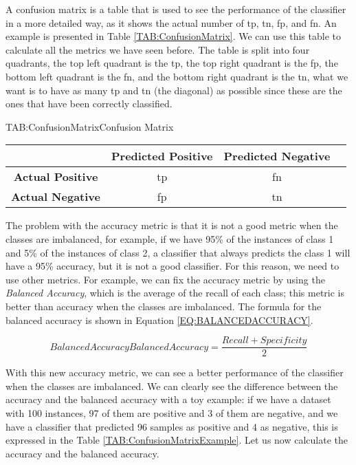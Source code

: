 A confusion matrix is a table that is used to see the performance of the classifier in a more detailed way, as it shows the actual number of \ac{tp}, \ac{tn}, \ac{fp}, and \ac{fn}. An example is presented in Table \ref{TAB:ConfusionMatrix}. We can use this table to calculate all the metrics we have seen before. The table is split into four quadrants, the top left quadrant is the \ac{tp}, the top right quadrant is the \ac{fp}, the bottom left quadrant is the \ac{fn}, and the bottom right quadrant is the \ac{tn}, what we want is to have as many \ac{tp} and \ac{tn} (the diagonal) as possible since these are the ones that have been correctly classified.

\begin{table}[Confusion Matrix]{TAB:ConfusionMatrix}{Confusion Matrix}
    \small
    \begin{tabular}{cccc}
            \hline
            & \textbf{Predicted Positive} & \textbf{Predicted Negative} \\
            \hline \hline
            \textbf{Actual Positive} & \acl{tp} & \acl{fn} \\
            \textbf{Actual Negative} & \acl{fp}  & \acl{tn} \\
            \hline
        \end{tabular}
\end{table}


The problem with the accuracy metric is that it is not a good metric when the classes are imbalanced, for example, if we have 95\% of the instances of class 1 and 5\% of the instances of class 2, a classifier that always predicts the class 1 will have a 95\% accuracy, but it is not a good classifier. For this reason, we need to use other metrics. For example, we can fix the accuracy metric by using the \textit{Balanced Accuracy}, which is the average of the recall of each class; this metric is better than accuracy when the classes are imbalanced. The formula for the balanced accuracy is shown in Equation \ref{EQ:BALANCEDACCURACY}.

\begin{equation}[EQ:BALANCEDACCURACY]{Balanced Accuracy}
    \boxed{Balanced Accuracy = \frac{Recall + Specificity}{2}}
\end{equation}

With this new accuracy metric, we can see a better performance of the classifier when the classes are imbalanced. We can clearly see the difference between the accuracy and the balanced accuracy with a toy example: if we have a dataset with 100 instances, 97 of them are positive and 3 of them are negative, and we have a classifier that predicted 96 samples as positive and 4 as negative, this is expressed in the Table \ref{TAB:ConfusionMatrixExample}. Let us now calculate the accuracy and the balanced accuracy.

